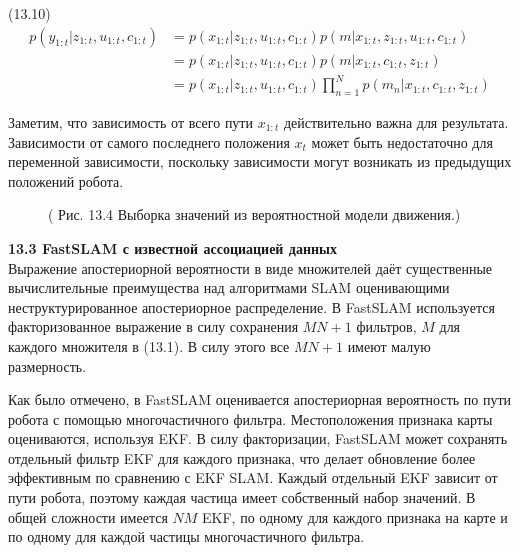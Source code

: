 \documentclass[10pt,a4paper]{article}
\begin{document}
(13.10)
\begin{equation*}
\begin{split}
p(y_{1:t}|z_{1:t},u_{1:t},c_{1:t})&=p(x_{1:t}|z_{1:t},u_{1:t},c_{1:t})p(m|x_{1:t},z_{1:t},u_{1:t},c_{1:t})\\
&=p(x_{1:t}|z_{1:t},u_{1:t},c_{1:t})p(m|x_{1:t},c_{1:t},z_{1:t})\\
&=p(x_{1:t}|z_{1:t},u_{1:t},c_{1:t})\prod_{n=1}^Np(m_n|x_{1:t},c_{1:t},z_{1:t})
\end{split}
\end{equation*}

Заметим, что зависимость от всего пути $x_{1:t}$ действительно важна для результата. Зависимости от самого последнего положения $x_t$ может быть недостаточно для переменной зависимости, поскольку зависимости могут возникать из предыдущих положений робота.

\begin{figure}[H]
	\caption{ ( Рис. 13.4   Выборка значений из вероятностной модели движения.) }
	\label{fig:134orig}
\end{figure}

\textbf{13.3	FastSLAM с известной ассоциацией данных}\\

Выражение апостериорной вероятности в виде множителей даёт существенные вычислительные преимущества над алгоритмами SLAM оценивающими неструктурированное апостериорное распределение. В FastSLAM используется факторизованное выражение в силу сохранения $MN +1$ фильтров, $M$ для каждого множителя в (13.1). В силу этого все $MN +1$ имеют малую размерность.

Как было отмечено, в FastSLAM оценивается апостериорная вероятность по пути робота с помощью многочастичного фильтра. Местоположения признака карты оцениваются, используя EKF. В силу факторизации, FastSLAM может сохранять отдельный фильтр EKF для каждого признака, что делает обновление более эффективным по сравнению с EKF SLAM. Каждый отдельный EKF зависит от пути робота, поэтому каждая частица имеет собственный набор значений. В общей сложности имеется $NM$ EKF, по одному для каждого признака на карте и по одному для каждой частицы многочастичного фильтра.
 
\end{document}
